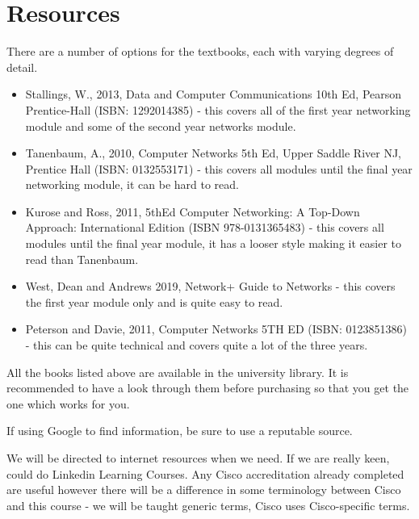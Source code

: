 \section*{Resources}
There are a number of options for the textbooks, each with varying degrees of detail. 
\begin{itemize}
    \item Stallings, W., 2013, Data and Computer Communications 10th Ed, Pearson Prentice-Hall (ISBN: 1292014385) - this covers all of the first year networking module and some of the second year networks module.
    \item Tanenbaum, A., 2010, Computer Networks 5th Ed, Upper Saddle River NJ, Prentice Hall (ISBN: 0132553171) - this covers all modules until the final year networking module, it can be hard to read.
    \item Kurose and Ross, 2011, 5thEd Computer Networking: A Top-Down Approach: International Edition (ISBN 978-0131365483) - this covers all modules until the final year module, it has a looser style making it easier to read than Tanenbaum.
    \item West, Dean and Andrews 2019, Network+ Guide to Networks - this covers the first year module only and is quite easy to read.
    \item Peterson and Davie, 2011, Computer Networks 5TH ED (ISBN: 0123851386) - this can be quite technical and covers quite a lot of the three years.
\end{itemize}
All the books listed above are available in the university library. It is recommended to have a look through them before purchasing so that you get the one which works for you. 

If using Google to find information, be sure to use a reputable source. 

We will be directed to internet resources when we need. If we are really keen, could do Linkedin Learning Courses. Any Cisco accreditation already completed are useful however there will be a difference in some terminology between Cisco and this course - we will be taught generic terms, Cisco uses Cisco-specific terms.